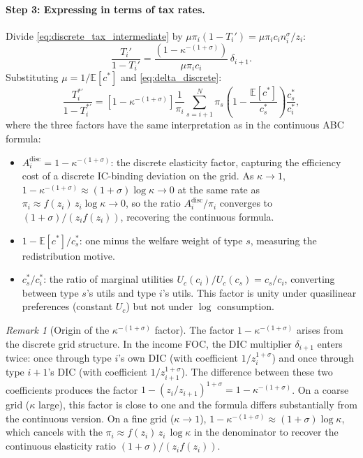 \documentclass[12pt,a4paper]{article}
\theoremstyle{definition}
\theoremstyle{plain}
\theoremstyle{remark}
\newtheorem{remark}{Remark}[section]
\newcommand{\E}{\mathbb{E}}
\begin{document}
\paragraph{Step 3: Expressing in terms of tax rates.}
Divide \eqref{eq:discrete_tax_intermediate} by $\mu \pi_i(1-T_i') = \mu \pi_i c_i n_i^{\sigma}/z_i$:
\[
  \frac{T_i'}{1-T_i'} = \frac{(1-\kappa^{-(1+\sigma)})}{\mu \pi_i c_i}\, \delta_{i+1}.
\]
Substituting $\mu = 1/\E[c^*]$ and \eqref{eq:delta_discrete}:
\begin{equation}
  \frac{T_i^{*\prime}}{1 - T_i^{*\prime}} = \left[1 - \kappa^{-(1+\sigma)}\right] \frac{1}{\pi_i} \sum_{s=i+1}^{N} \pi_s \left(1 - \frac{\E[c^*]}{c_s^*}\right) \frac{c_s^*}{c_i^*},
  \label{eq:DS_discrete}
\end{equation}
where the three factors have the same interpretation as in the continuous ABC formula:
\begin{itemize}[leftmargin=2em]
  \item $A_i^{\text{disc}} = 1 - \kappa^{-(1+\sigma)}$: the discrete elasticity factor, capturing the efficiency cost of a discrete IC-binding deviation on the grid. As $\kappa \to 1$, $1 - \kappa^{-(1+\sigma)} \approx (1+\sigma)\log\kappa \to 0$ at the same rate as $\pi_i \approx f(z_i)\, z_i\log\kappa \to 0$, so the ratio $A_i^{\text{disc}}/\pi_i$ converges to $(1+\sigma)/(z_i f(z_i))$, recovering the continuous formula.
  \item $1 - \E[c^*]/c_s^*$: one minus the welfare weight of type $s$, measuring the redistribution motive.
  \item $c_s^*/c_i^*$: the ratio of marginal utilities $U_c(c_i)/U_c(c_s) = c_s/c_i$, converting between type $s$'s utils and type $i$'s utils. This factor is unity under quasilinear preferences (constant $U_c$) but not under $\log$ consumption.
\end{itemize}

\begin{remark}[Origin of the $\kappa^{-(1+\sigma)}$ factor]
The factor $1 - \kappa^{-(1+\sigma)}$ arises from the discrete grid structure. In the income FOC, the DIC multiplier $\delta_{i+1}$ enters twice: once through type $i$'s own DIC (with coefficient $1/z_i^{1+\sigma}$) and once through type $i+1$'s DIC (with coefficient $1/z_{i+1}^{1+\sigma}$). The difference between these two coefficients produces the factor $1 - (z_i/z_{i+1})^{1+\sigma} = 1 - \kappa^{-(1+\sigma)}$. On a coarse grid ($\kappa$ large), this factor is close to one and the formula differs substantially from the continuous version. On a fine grid ($\kappa \to 1$), $1 - \kappa^{-(1+\sigma)} \approx (1+\sigma)\log\kappa$, which cancels with the $\pi_i \approx f(z_i)\,z_i\,\log\kappa$ in the denominator to recover the continuous elasticity ratio $(1+\sigma)/(z_i f(z_i))$.
\end{remark}
\end{document}
